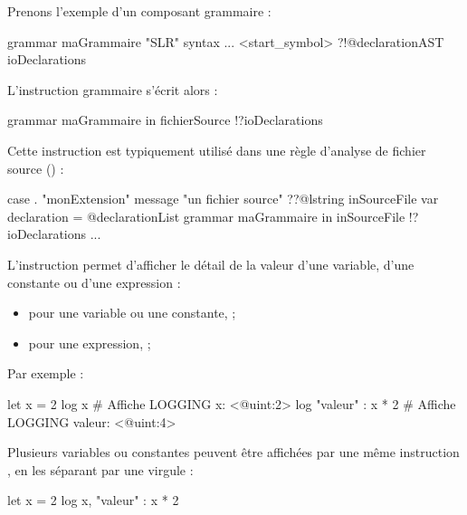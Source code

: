 {{Prenons l'exemple d'un composant grammaire :
\begin{galgascode}
grammar maGrammaire "SLR" {
  syntax ...
   <start_symbol> ?!@declarationAST ioDeclarations
}
\end{galgascode}

L'instruction grammaire s'écrit alors :
\begin{galgascode}
grammar maGrammaire in fichierSource !?ioDeclarations
\end{galgascode}

Cette instruction est typiquement utilisé dans une règle d'analyse de fichier source () :

\begin{galgascode}
case . "monExtension"
message "un fichier source"
??@lstring inSourceFile {
  var declaration = @declarationList {}
  grammar maGrammaire in inSourceFile !?ioDeclarations
  ...
}
\end{galgascode}
















L'instruction  permet d'afficher le détail de la valeur d'une variable, d'une constante ou d'une expression :
\begin{itemize}
  \item pour une variable ou une constante,  ;
  \item pour une expression,  ;
\end{itemize}

Par exemple :
\begin{galgascode}
let x = 2
log x # Affiche LOGGING x: <@uint:2>
log "valeur" : x * 2 # Affiche LOGGING valeur: <@uint:4>
\end{galgascode}

Plusieurs variables ou constantes peuvent être affichées par une même instruction , en les séparant par une virgule :
\begin{galgascode}
let x = 2
log x, "valeur" : x * 2
\end{galgascode}














}}
